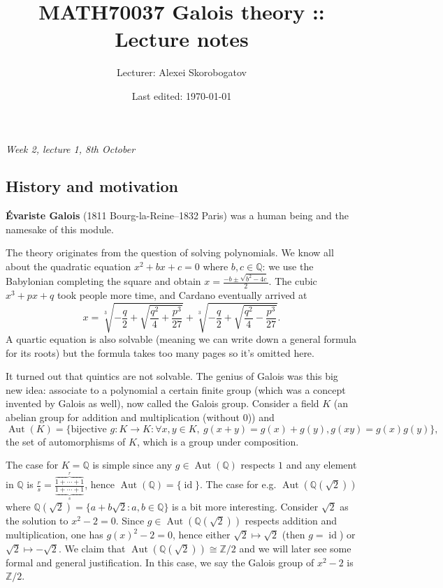 \documentclass{article}
\title{MATH70037 Galois theory :: Lecture notes}
\author{Lecturer: Alexei Skorobogatov}
\date{Last edited: \today}
\newcommand{\Z}{\mathbb{Z}}
\newcommand{\Q}{\mathbb{Q}}
\newcommand{\Aut}{\operatorname{Aut}}
\newcommand{\id}{\operatorname{id}}
\theoremstyle{definition}
\begin{document}
\maketitle
\thispagestyle{empty}

\tableofcontents
\thispagestyle{empty}
\newpage
\setcounter{page}{1}

\begin{flushright}
\textit{Week 2, lecture 1, 8th October}
\end{flushright}

\subsection*{History and motivation}
\label{subsection:historymotivation}
\textbf{Évariste Galois} (1811 Bourg-la-Reine--1832 Paris) was a human being and the namesake of this module.

The theory originates from the question of solving polynomials. We know all about the quadratic equation $x^2+bx+c=0$ where $b,c\in\Q$: we use the Babylonian completing the square and obtain $\displaystyle x=\frac{-b\pm\sqrt{b^2-4c}}{2}$. The cubic $x^3+px+q$ took people more time, and Cardano eventually arrived at
\[
x=\sqrt[3]{-\frac{q}{2}+\sqrt{\frac{q^2}{4}+\frac{p^3}{27}}}+\sqrt[3]{-\frac{q}{2}+\sqrt{\frac{q^2}{4}-\frac{p^3}{27}}}.
\]
A quartic equation is also solvable (meaning we can write down a general formula for its roots) but the formula takes too many pages so it's omitted here.

It turned out that quintics are not solvable. The genius of Galois was this big new idea: associate to a polynomial a certain finite group (which was a concept invented by Galois as well), now called the Galois group. Consider a field $K$ (an abelian group for addition and multiplication (without 0)) and
\[
\Aut(K)=\{\text{bijective }g:K\rightarrow K:\forall x,y\in K,\ g(x+y)=g(x)+g(y),g(xy)=g(x)g(y)\},
\]
the set of automorphisms of $K$, which is a group under composition.

The case for $K=\Q$ is simple since any $g\in\Aut(\Q)$ respects $1$ and any element in $\Q$ is $\frac{r}{s}=\frac{\overbrace{1+\cdots+1}^r}{\underbrace{1+\cdots+1}_s}$, hence $\Aut(\Q)=\{\id\}$. The case for e.g. $\Aut(\Q(\sqrt 2))$ where $\Q(\sqrt 2)=\{a+b\sqrt 2:a,b\in\Q\}$ is a bit more interesting. Consider $\sqrt2$ as the solution to $x^2-2=0$. Since $g\in\Aut(\Q(\sqrt 2))$ respects addition and multiplication, one has $g(x)^2-2=0$, hence either $\sqrt 2\mapsto\sqrt 2$ (then $g=\id$) or $\sqrt 2\mapsto-\sqrt 2$. We claim that $\Aut(\Q(\sqrt 2))\cong\Z/2$ and we will later see some formal and general justification. In this case, we say the Galois group of $x^2-2$ is $\Z/2$.
\end{document}

